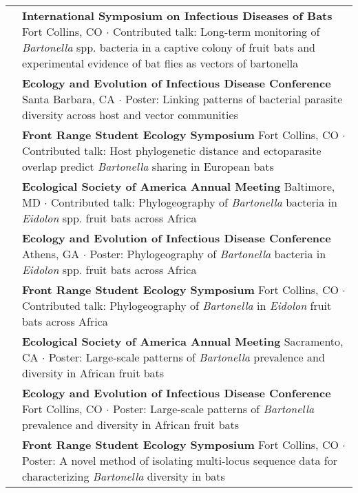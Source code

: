 \documentclass[letterpaper]{deedy-resume} %
\begin{document}
\begin{tabular}{>{\raggedright\arraybackslash}p{2cm}p{16cm}}
2017 & \textbf{International Symposium on Infectious Diseases of Bats} Fort Collins, CO $\cdot$ Contributed talk: Long-term monitoring of \textit{Bartonella} spp. bacteria in a captive colony of fruit bats and experimental evidence of bat flies as vectors of bartonella\\

2017 & \textbf{Ecology and Evolution of Infectious Disease Conference} Santa Barbara, CA $\cdot$ Poster: Linking patterns of bacterial parasite diversity across host and vector communities\\

2017 & \textbf{Front Range Student Ecology Symposium} Fort Collins, CO $\cdot$ Contributed talk: Host phylogenetic distance and ectoparasite overlap predict \textit{Bartonella} sharing in European bats\\

2015 & \textbf{Ecological Society of America Annual Meeting} Baltimore, MD $\cdot$ Contributed talk: Phylogeography of \textit{Bartonella} bacteria in \textit{Eidolon} spp. fruit bats across Africa\\

2015 & \textbf{Ecology and Evolution of Infectious Disease Conference} Athens, GA $\cdot$ Poster: Phylogeography of \textit{Bartonella} bacteria in \textit{Eidolon} spp. fruit bats across Africa\\
	
2015 & \textbf{Front Range Student Ecology Symposium} Fort Collins, CO $\cdot$ Contributed talk: Phylogeography of \textit{Bartonella} in \textit{Eidolon} fruit bats across Africa\\

2014 & \textbf{Ecological Society of America Annual Meeting} Sacramento, CA $\cdot$ Poster: Large-scale patterns of \textit{Bartonella} prevalence and diversity in African fruit bats\\

2014 & \textbf{Ecology and Evolution of Infectious Disease Conference} Fort Collins, CO $\cdot$ Poster: Large-scale patterns of \textit{Bartonella} prevalence and diversity in African fruit bats\\

2014 & \textbf{Front Range Student Ecology Symposium} Fort Collins, CO $\cdot$ Poster: A novel method of isolating multi-locus sequence data for characterizing \textit{Bartonella} diversity in bats\\

\end{tabular}
\sectionspace
\end{document}
